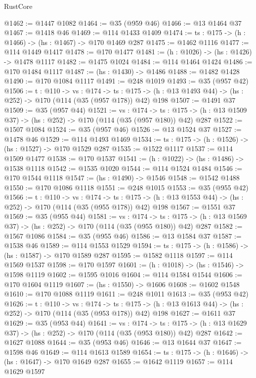 \begin{lexlean}{RustCore}
\begin{coremodule}
@1462 := @1447 @1082
@1464 := @35 (@959 @46)
@1466 := @13 @1464 @37
@1467 := @1418 @46
@1469 := @114 @1433 @1409
@1474 := {ts : @175} -> (h : @1466) -> (hs : @1467) -> @170 @1469 @287
@1475 := @1462 @1116
@1477 := @114 @1449 @1417
@1478 := @170 @1477
@1481 := (h : @1026) -> (hs : @1426) -> @1478 @1117
@1482 := @1475 @1024
@1484 := @114 @1464 @1424
@1486 := @170 @1484 @1117
@1487 := (hs : @1430) -> @1486
@1488 := @1482 @1428
@1490 := @170 @1084 @1117
@1491 := @248 @1019
@1493 := @35 (@957 @42)
@1506 := {t : @110} ->
  {vs : @174} ->
  {ts : @175} -> (h : @13 @1493 @44) -> (hs : @252) -> @170 (@114 (@35 (@957 @178)) @42) @198
@1507 := @1491 @37
@1509 := @35 (@957 @44)
@1521 := {vs : @174} ->
  {ts : @175} -> (h : @13 @1509 @37) -> (hs : @252) -> @170 (@114 (@35 (@957 @180)) @42) @287
@1522 := @1507 @1084
@1524 := @35 (@957 @46)
@1526 := @13 @1524 @37
@1527 := @1478 @46
@1529 := @114 @1493 @1469
@1534 := {ts : @175} -> (h : @1526) -> (hs : @1527) -> @170 @1529 @287
@1535 := @1522 @1117
@1537 := @114 @1509 @1477
@1538 := @170 @1537
@1541 := (h : @1022) -> (hs : @1486) -> @1538 @1118
@1542 := @1535 @1020
@1544 := @114 @1524 @1484
@1546 := @170 @1544 @1118
@1547 := (hs : @1490) -> @1546
@1548 := @1542 @1488
@1550 := @170 @1086 @1118
@1551 := @248 @1015
@1553 := @35 (@955 @42)
@1566 := {t : @110} ->
  {vs : @174} ->
  {ts : @175} -> (h : @13 @1553 @44) -> (hs : @252) -> @170 (@114 (@35 (@955 @178)) @42) @198
@1567 := @1551 @37
@1569 := @35 (@955 @44)
@1581 := {vs : @174} ->
  {ts : @175} -> (h : @13 @1569 @37) -> (hs : @252) -> @170 (@114 (@35 (@955 @180)) @42) @287
@1582 := @1567 @1086
@1584 := @35 (@955 @46)
@1586 := @13 @1584 @37
@1587 := @1538 @46
@1589 := @114 @1553 @1529
@1594 := {ts : @175} -> (h : @1586) -> (hs : @1587) -> @170 @1589 @287
@1595 := @1582 @1118
@1597 := @114 @1569 @1537
@1598 := @170 @1597
@1601 := (h : @1018) -> (hs : @1546) -> @1598 @1119
@1602 := @1595 @1016
@1604 := @114 @1584 @1544
@1606 := @170 @1604 @1119
@1607 := (hs : @1550) -> @1606
@1608 := @1602 @1548
@1610 := @170 @1088 @1119
@1611 := @248 @1011
@1613 := @35 (@953 @42)
@1626 := {t : @110} ->
  {vs : @174} ->
  {ts : @175} -> (h : @13 @1613 @44) -> (hs : @252) -> @170 (@114 (@35 (@953 @178)) @42) @198
@1627 := @1611 @37
@1629 := @35 (@953 @44)
@1641 := {vs : @174} ->
  {ts : @175} -> (h : @13 @1629 @37) -> (hs : @252) -> @170 (@114 (@35 (@953 @180)) @42) @287
@1642 := @1627 @1088
@1644 := @35 (@953 @46)
@1646 := @13 @1644 @37
@1647 := @1598 @46
@1649 := @114 @1613 @1589
@1654 := {ts : @175} -> (h : @1646) -> (hs : @1647) -> @170 @1649 @287
@1655 := @1642 @1119
@1657 := @114 @1629 @1597

\end{coremodule}
\end{lexlean}
